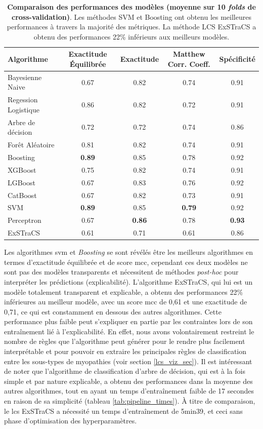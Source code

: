 \begin{table}[!htbp]
\centering
\begin{tabular}{lcccc}
\hline
Algorithme & Exactitude Équilibrée & Exactitude & Matthew Corr. Coeff. & Spécificité  \\
\hline
Bayesienne Naive & 0.67 & 0.82 & 0.74 & 0.91 \\
Regession Logistique & 0.86 & 0.82 & 0.72 & 0.91 \\
Arbre de décision & 0.72 & 0.72 & 0.74 & 0.86 \\
Forêt Aléatoire & 0.81 & 0.82 & 0.74 & 0.91 \\
Boosting & \textbf{0.89} & 0.85 & 0.78 & 0.92 \\
XGBoost & 0.75 & 0.82 & 0.74 & 0.91 \\
LGBoost & 0.67 & 0.83 & 0.76 & 0.92 \\
CatBoost & 0.67 & 0.82 & 0.73 & 0.91 \\
SVM & \textbf{0.89} & 0.85 & \textbf{0.79} & 0.92 \\
Perceptron & 0.67 & \textbf{0.86} & 0.78 & \textbf{0.93}\\
ExSTraCS & 0.61 & 0.71 & 0.61 & 0.86 \\
\hline
\end{tabular}
\caption[Comparaison des performances des modèles (moyenne sur 10 folds de cross-validation)]{\textbf{Comparaison des performances des modèles (moyenne sur 10 \textit{folds} de cross-validation)}. Les méthodes SVM et Boosting ont obtenu les meilleures performances à travers la majorité des métriques. La méthode LCS ExSTraCS a obtenu des performances 22\% inférieurs aux meilleurs modèles.}
\label{table:ml_metrics}
\end{table}        
Les algorithmes \gls{svm} et \textit{Boosting } se sont révélés être les meilleurs algorithmes en termes d'exactitude équilibrée et de score \gls{mcc}, cependant ces deux modèles ne sont pas des modèles transparents et nécessitent de méthodes \textit{post-hoc} pour interpréter les prédictions (explicabilité). L'algorithme ExSTraCS, qui lui est un modèle totalement transparent et explicable, a obtenu des performances 22\% inférieures au meilleur modèle, avec un score \gls{mcc} de 0,61 et une exactitude de 0,71, ce qui est constamment en dessous des autres algorithmes. Cette performance plus faible peut s'expliquer en partie par les contraintes lors de son entraînement lié à l'explicabilité. En effet, nous avons volontairement restreint le nombre de règles que l'algorithme peut générer pour le rendre plus facilement interprétable et pour pouvoir en extraire les principales règles de classification entre les sous-types de myopathies (voir section \ref{lcs_viz_sec}). Il est intéressant de noter que l'algorithme de classification d'arbre de décision, qui est à la fois simple et par nature explicable, a obtenu des performances dans la moyenne des autres algorithmes, tout en ayant un temps d'entraînement faible de 17 secondes en raison de sa simplicité (tableau \ref{tab:pipeline_times}). À titre de comparaison, le \gls{lcs} ExSTraCS a nécessité un temps d'entraînement de 5min39, et ceci sans phase d'optimisation des hyperparamètres.
